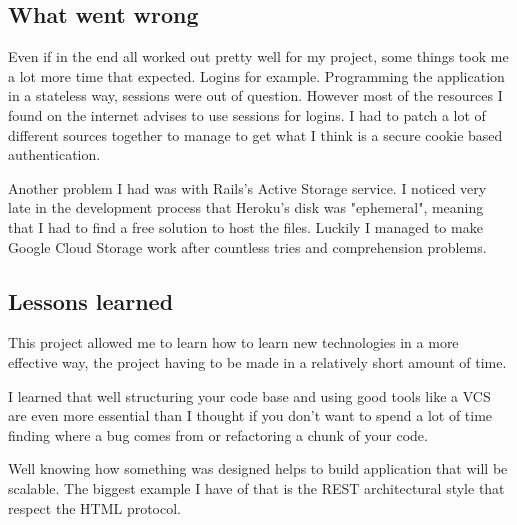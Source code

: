 \documentclass[12pt,a4paper]{article}
\begin{document}
\subsection{What went wrong}

Even if in the end all worked out pretty well for my project, some things took me
a lot more time that expected. Logins for example. Programming the application
in a stateless way, sessions were out of question. However most of the
resources I found on the internet advises to use sessions for logins. I had to
patch a lot of different sources together to manage to get what I think is a
secure cookie based authentication.

Another problem I had was with Rails's Active Storage service. I noticed very
late in the development process that Heroku's disk was "ephemeral", meaning
that I had to find a free solution to host the files. Luckily I managed to make
Google Cloud Storage work after countless tries and comprehension problems.

\subsection{Lessons learned}

This project allowed me to learn how to learn new technologies in a more effective
way, the project having to be made in a relatively short amount of time.

I learned that well structuring your code base and using good tools like a VCS
are even more essential than I thought if you don't want to spend a lot of time
finding where a bug comes from or refactoring a chunk of your code.

Well knowing how something was designed helps to build application that will be
scalable. The biggest example I have of that is the REST architectural style
that respect the HTML protocol.
\end{document}
